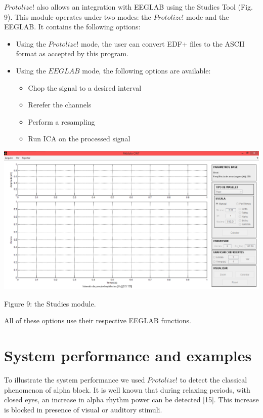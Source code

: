 \documentclass[12pt, a4paper]{article}
\begin{document}
$Protolize!$ also allows an integration with EEGLAB using the Studies Tool (Fig. 9). This module operates under two modes: the $Protolize!$ mode and the EEGLAB. It contains the following options:
\begin{itemize}
\item Using the $Protolize!$ mode, the user can convert EDF+ files to the ASCII format as accepted by this program.
\item Using the $EEGLAB$ mode, the following options are available:
    \begin{itemize}
    \item Chop the signal to a desired interval
    \item Rerefer the channels
    \item Perform a resampling
    \item Run ICA on the processed signal
    \end{itemize}
\end{itemize}
\begin{center}
\includegraphics[width=15cm]{cwt.png}

Figure 9: the Studies module.
\end{center}

All of these options use their respective EEGLAB functions.

\section{System performance and examples}

To illustrate the system performance we used $Protolize!$ to detect the classical phenomenon of alpha block.  It is well known that during relaxing periods, with closed eyes, an increase in alpha rhythm power can be detected [15]. This increase is blocked in presence of visual or auditory stimuli.
\end{document}
